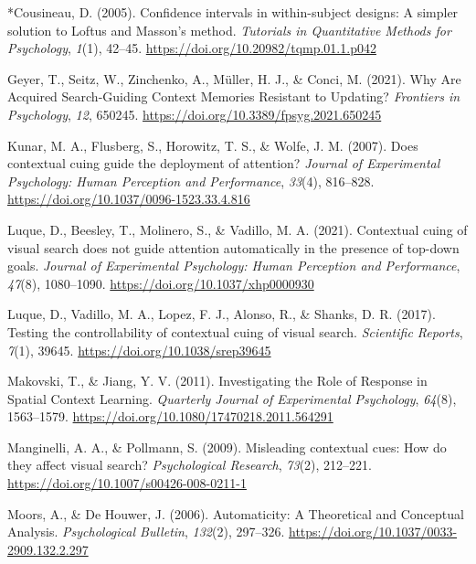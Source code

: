 \documentclass[
  man,
  floatsintext,
  longtable,
  nolmodern,
  notxfonts,
  notimes,
  colorlinks=true,linkcolor=blue,citecolor=blue,urlcolor=blue]{apa7}
\newlength{\cslhangindent}
\newenvironment{CSLReferences}[2] %
 {\begin{list}{}{%
  \setlength{\itemindent}{0pt}
  \setlength{\leftmargin}{0pt}
  \setlength{\parsep}{0pt}
  \ifodd #1
   \setlength{\leftmargin}{\cslhangindent}
   \setlength{\itemindent}{-1\cslhangindent}
  \fi
  \setlength{\itemsep}{#2\baselineskip}}}
 {\end{list}}
\begin{document}
\begin{CSLReferences}{1}{0}
*Cousineau, D. (2005). Confidence intervals in within-subject designs:
{A} simpler solution to {Loftus} and {Masson}'s method. \emph{Tutorials
in Quantitative Methods for Psychology}, \emph{1}(1), 42--45.
\url{https://doi.org/10.20982/tqmp.01.1.p042}

Geyer, T., Seitz, W., Zinchenko, A., Müller, H. J., \& Conci, M. (2021).
Why {Are Acquired Search-Guiding Context Memories Resistant} to
{Updating}? \emph{Frontiers in Psychology}, \emph{12}, 650245.
\url{https://doi.org/10.3389/fpsyg.2021.650245}

Kunar, M. A., Flusberg, S., Horowitz, T. S., \& Wolfe, J. M. (2007).
Does contextual cuing guide the deployment of attention? \emph{Journal
of Experimental Psychology: Human Perception and Performance},
\emph{33}(4), 816--828. \url{https://doi.org/10.1037/0096-1523.33.4.816}

Luque, D., Beesley, T., Molinero, S., \& Vadillo, M. A. (2021).
Contextual cuing of visual search does not guide attention automatically
in the presence of top-down goals. \emph{Journal of Experimental
Psychology: Human Perception and Performance}, \emph{47}(8), 1080--1090.
\url{https://doi.org/10.1037/xhp0000930}

Luque, D., Vadillo, M. A., Lopez, F. J., Alonso, R., \& Shanks, D. R.
(2017). Testing the controllability of contextual cuing of visual
search. \emph{Scientific Reports}, \emph{7}(1), 39645.
\url{https://doi.org/10.1038/srep39645}

Makovski, T., \& Jiang, Y. V. (2011). Investigating the {Role} of
{Response} in {Spatial Context Learning}. \emph{Quarterly Journal of
Experimental Psychology}, \emph{64}(8), 1563--1579.
\url{https://doi.org/10.1080/17470218.2011.564291}

Manginelli, A. A., \& Pollmann, S. (2009). Misleading contextual cues:
{How} do they affect visual search? \emph{Psychological Research},
\emph{73}(2), 212--221. \url{https://doi.org/10.1007/s00426-008-0211-1}

Moors, A., \& De Houwer, J. (2006). Automaticity: {A Theoretical} and
{Conceptual Analysis}. \emph{Psychological Bulletin}, \emph{132}(2),
297--326. \url{https://doi.org/10.1037/0033-2909.132.2.297}


\end{CSLReferences}
\end{document}
